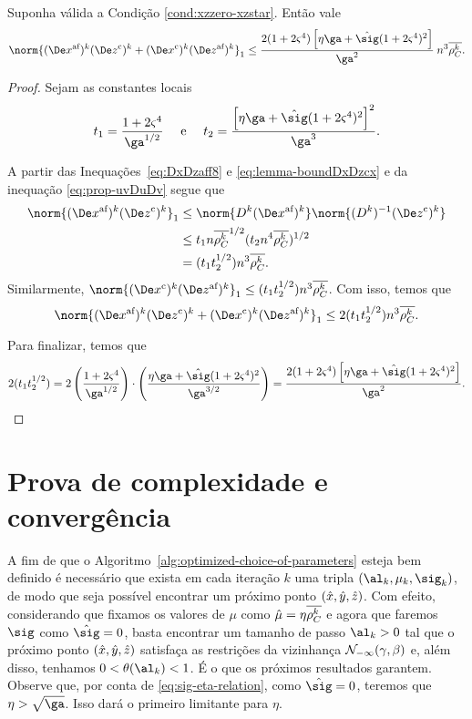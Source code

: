 \begin{lema}\label{lemma:boundDxDzaff-c}
	Suponha válida a Condição  \ref{cond:xzzero-xzstar}. Então vale 
	\begin{equation}\label{eq:lemma-boundDxDzaff-c}
		\norm{ \dekx\Dekcoz + \Dekcox  \dekz  }_{1} \leq \dfrac{2(1+2\bdxzstar^{4})\left[\eta\ga + \nextsig(1+2\bdxzstar^{4})^{2}\right]}{\ga^{2}}\: n^{3}\rhoCkb.
	\end{equation}

\end{lema}

\begin{proof}  Sejam as constantes locais
\[
t_{1} = \frac{1 + 2\bdxzstar^{4} }{\ga^{1/2}} \quad \text{ e } \quad t_{2} = \dfrac{\left[\eta\ga + \nextsig(1+2\bdxzstar^{4})^{2}\right]^{2}}{\ga^{3}}.
\]
 
	A partir  das Inequações~\eqref{eq:DxDzaff8} e \eqref{eq:lemma-boundDxDzcx} e da inequação \eqref{eq:prop-uvDuDv} segue que  
	\[
	\begin{aligned}	
		\norm{ \dekx \Dekcoz}_{1} & \leq \norm{\Dk \dekx }\norm{\Dik\Dekcoz}\\
							  & \leq 	t_1 n\rhoCkb ^{1/2}(t_2 n^{4}\rhoCkb )^{1/2}  \\
							  & = (t_1t_2^{1/2})n^{3}\rhoCkb .
	\end{aligned}\]			  
Similarmente, 	$\norm{\Dekcox \dekz }_{1} \leq (t_1t_2^{1/2})n^{3}\rhoCkb $. Com isso, temos  que 
\[
		\norm{ \dekx \Dekcoz + \Dekcox \dekz }_{1} \leq 2(t_1t_2^{1/2})n^{3}\rhoCkb .
\]

Para finalizar, temos que  
\[
2(t_1t_2^{1/2}) = 2\left(\frac{1 + 2\bdxzstar^{4} }{\ga^{1/2}}\right) \cdot\left( \dfrac{\eta\ga + \nextsig(1+2\bdxzstar^{4})^{2}}{\ga^{3/2}}\right) = \dfrac{2(1+2\bdxzstar^{4})\left[\eta\ga + \nextsig(1+2\bdxzstar^{4})^{2}\right]}{\ga^{2}}. \qedhere
\]
\end{proof}

\section{Prova de complexidade e  convergência}

A fim de que o Algoritmo~\ref{alg:optimized-choice-of-parameters} esteja bem definido é necessário que exista em cada iteração $k$ uma tripla $(\al_k,\mu_k,\sig_k)$, de modo que seja possível encontrar um próximo ponto $(\hat{x},\hat{y},\hat{z})$. Com efeito, considerando que fixamos os valores de $\mu$ como $\hat{\mu} = \eta\overline{\rho_C^{k}}$ e  agora que faremos $\sig$ como $\nextsig=0$, basta encontrar um  tamanho de passo ${\al_k}>0$ tal que o próximo ponto $(\hat{x},\hat{y},\hat{z})$ satisfaça as restrições da vizinhança 
$\mathcal{N}_{-\infty}(\gamma,\beta)$ e, além disso, tenhamos   $0 < \theta(\al_k) <1$. É o que os próximos resultados garantem. Observe que, por conta de \eqref{eq:sig-eta-relation}, como $\nextsig =0$, teremos que $\eta>\sqrt{\ga}$. Isso dará o primeiro limitante para $\eta$.



